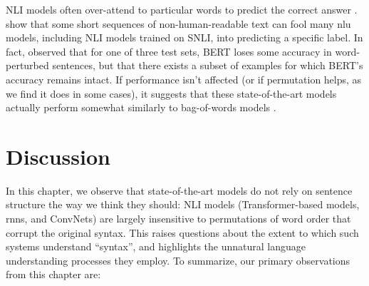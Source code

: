 \documentclass[letterpaper, 12pt]{report}
\begin{document}
NLI models often over-attend to particular words to predict the correct answer \citep{gururangan-etal-2018-annotation, clark-etal-2019-bert}. \cite{wallace-etal-2019-universal} show that some short sequences of non-human-readable text can fool many \acrshort{nlu} models, including NLI models trained on SNLI, into predicting a specific label. In fact, \cite{ettinger-2020-whatbertisnot} observed that for one of three test sets, BERT loses some accuracy in word-perturbed sentences, but that there exists a subset of examples for which BERT’s accuracy remains intact.
If performance isn't affected (or if permutation helps, as we find it does in some cases), it suggests that these state-of-the-art models actually perform somewhat similarly to bag-of-words models \cite{blei-etal-2003-latent, mikolov2013efficient}.




\section{Discussion}
\label{sec:unli_discussion}

In this chapter, we observe that state-of-the-art models do not rely on sentence structure the way we think they should: NLI models (Transformer-based models, \acrshort{rnn}s, and ConvNets) are largely insensitive to permutations of word order that corrupt the original syntax. This raises questions about the extent to which such systems understand ``syntax'', and highlights the unnatural language understanding processes they employ. To summarize, our primary observations from this chapter are:
\end{document}
